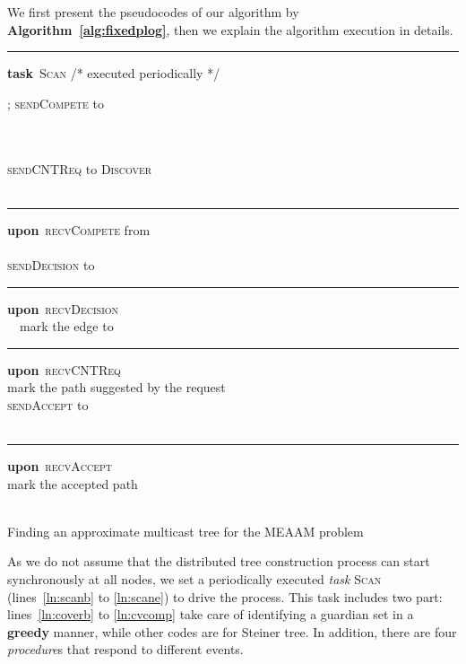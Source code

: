 \documentclass[10pt, conference, compsocconf]{IEEEtran}
\begin{document}
    We first present the pseudocodes of our algorithm by \textbf{Algorithm~\ref{alg:fixedplog}}, then we explain the algorithm execution in details.
\begin{algorithm}[h!]
\hrule
\textbf{task}~\textsc{Scan}  \hfill /* \textsf{\small executed periodically} */ \label{ln:scanb} \\
      \uIf {} { \label{ln:coverb}
        \ForAll {} {
          \If {} { \label{ln:count}
            
          }
        }
\lIf {} {
          ; \textsc{sendCompete} to  \label{ln:cvcomp}
        }
}
      \ElseIf {} {
        \ForAll {} { \label{ln:pathqb}
          \If {} {
             \\
             \label{ln:pathqe}
          }
        }
        \If {} {
           \label{ln:ssp} \\
          \textsc{sendCNTReq} to  \label{ln:ssps}
        }
      }
      \lElseIf {} {
        \textsc{Discover} \\
      }
      \ElseIf {} {
         {} \label{ln:terminate} \\
         \label{ln:scane}
      }
\hrule
\textbf{upon}~\textsc{recvCompete} from  \\
\uIf {} { \label{ln:winner}
         \label{ln:s1tos2} \\
        \textsc{sendDecision} to  \label{ln:notecv}
      }
      \lElse {
         \label{ln:confirmcv} \\
      }
      
\hrule
\textbf{upon}~\textsc{recvDecision} \\
      ~~mark the edge to 
\hrule
\textbf{upon}~\textsc{recvCNTReq} \\
      \If {} { \label{ln:match}
        mark the path suggested by the request \\
        \textsc{sendAccept} to   \\
        \lIf {} { \label{ln:sid1}
           \\
        }
        \lElse {
          
        }
      }
\hrule
\textbf{upon}~\textsc{recvAccept}  \\
      mark the accepted path \\
      \lIf {} { \label{ln:sid2}
         \\
      }
      \lElse {
        
      }
\caption{Finding an approximate multicast tree  for the MEAAM problem} \label{alg:fixedplog}
    \end{algorithm}
As we do not assume that the distributed tree construction process can start synchronously at all nodes, we set a periodically executed \textit{task} \textsc{Scan} (lines~\ref{ln:scanb} to \ref{ln:scane}) to drive the process. This task includes two part: lines~\ref{ln:coverb} to \ref{ln:cvcomp} take care of identifying a guardian set  in a \textbf{greedy} manner, while other codes are for Steiner tree. In addition, there are four \textit{procedure}s that respond to different events.
\end{document}
